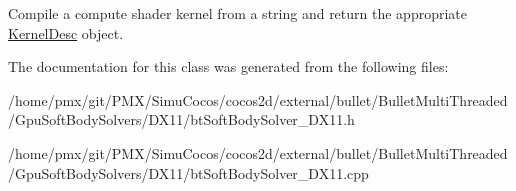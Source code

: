 Compile a compute shader kernel from a string and return the appropriate \hyperlink{classDXFunctions_1_1KernelDesc}{Kernel\+Desc} object. 

The documentation for this class was generated from the following files\+:\begin{DoxyCompactItemize}
\item 
/home/pmx/git/\+P\+M\+X/\+Simu\+Cocos/cocos2d/external/bullet/\+Bullet\+Multi\+Threaded/\+Gpu\+Soft\+Body\+Solvers/\+D\+X11/bt\+Soft\+Body\+Solver\+\_\+\+D\+X11.\+h\item 
/home/pmx/git/\+P\+M\+X/\+Simu\+Cocos/cocos2d/external/bullet/\+Bullet\+Multi\+Threaded/\+Gpu\+Soft\+Body\+Solvers/\+D\+X11/bt\+Soft\+Body\+Solver\+\_\+\+D\+X11.\+cpp\end{DoxyCompactItemize}
